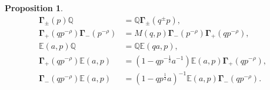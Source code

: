 \documentclass{amsart}
\newtheorem{proposition}[theorem]{Proposition}
\theoremstyle{definition}
\newcommand{\QQ} {\mathbb{Q}}		%
\newcommand{\bfGamma} {\mathbf{\Gamma}}
\newcommand{\EE}{\mathbb{E}}
\begin{document}
\begin{proposition} \label{commutators}
\begin{align} 
\bfGamma_{\pm}(p) \QQ &= \QQ \bfGamma_{\pm}(q^{\pm} p), \label{bfgammaQ} \\
\bfGamma_+(q p^{-\rho}) \mathbf{\Gamma}_-(p^{-\rho}) &= M(q,p) \bfGamma_-(p^{-\rho}) \bfGamma_+(q p^{-\rho}), \label{bfgammapm} \\
\EE(a,p) \QQ &= \QQ \EE(q a,p) \label{EQ}, \\
\bfGamma_+(q p^{-\rho}) \EE(a,p) &= (1-q p^{-\frac{1}{2}} a^{-1}) \EE(a,p)\bfGamma_+(q p^{-\rho}), \label{bfgamma+E} \\
\bfGamma_-(q p^{-\rho}) \EE(a,p) &= (1-q p^{\frac{1}{2}} a)^{-1} \EE(a,p)\bfGamma_-(q p^{-\rho}) \label{bfgamma-E}.
\end{align}
\end{proposition}
\end{document}
